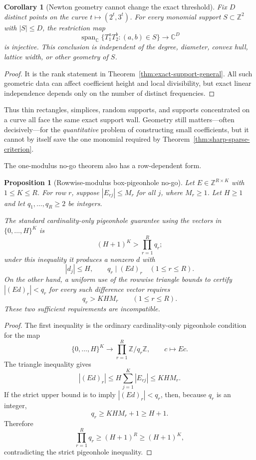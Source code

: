 \documentclass[11pt,oneside]{article}
\newtheorem{proposition}[theorem]{Proposition}
\newtheorem{corollary}[theorem]{Corollary}
\theoremstyle{definition}
\theoremstyle{remark}
\newcommand{\Z}{\mathbb Z}
\newcommand{\C}{\mathbb C}
\newcommand{\Span}{\operatorname{span}}
\begin{document}
\begin{corollary}[Newton geometry cannot change the exact threshold]
\label{cor:newton-geometry-no-shortcut}
Fix $D$ distinct points on the curve $t\mapsto(2^t,3^t)$.  For every monomial support
$S\subset\Z^2$ with $|S|\le D$, the restriction map
\[
  \Span_{\C}\{T_1^aT_2^b:(a,b)\in S\}
  \longrightarrow \C^D
\]
is injective.  This conclusion is independent of the degree, diameter, convex hull, lattice
width, or other geometry of $S$.
\end{corollary}

\begin{proof}
It is the rank statement in Theorem~\ref{thm:exact-support-general}.  All such geometric data
can affect coefficient height and local divisibility, but exact linear independence depends
only on the number of distinct frequencies.
\end{proof}

Thus thin rectangles, simplices, random supports, and supports concentrated on a curve all
face the same exact support wall.  Geometry still matters---often decisively---for the
\emph{quantitative} problem of constructing small coefficients, but it cannot by itself save
the one monomial required by Theorem~\ref{thm:sharp-sparse-criterion}.

The one-modulus no-go theorem also has a row-dependent form.

\begin{proposition}[Rowwise-modulus box-pigeonhole no-go]
\label{prop:rowwise-modulus-no-go}
Let $E\in\Z^{R\times K}$ with $1\le K\le R$.  For row $r$, suppose
$|E_{rj}|\le M_r$ for all $j$, where $M_r\ge1$.  Let $H\ge1$ and let
$q_1,\dots,q_R\ge2$ be integers.

The standard cardinality-only pigeonhole guarantee using the vectors in
$\{0,\dots,H\}^K$ is
\[
  (H+1)^K>\prod_{r=1}^R q_r;
\]
under this inequality it produces a nonzero $d$ with
\[
  |d_j|\le H,
  \qquad q_r\mid(Ed)_r\quad(1\le r\le R).
\]
On the other hand, a uniform use of the rowwise triangle bounds to certify
$|(Ed)_r|<q_r$ for every such difference vector requires
\[
  q_r>KHM_r\qquad(1\le r\le R).
\]
These two sufficient requirements are incompatible.
\end{proposition}

\begin{proof}
The first inequality is the ordinary cardinality-only pigeonhole condition for the map
\[
  \{0,\dots,H\}^K\longrightarrow
  \prod_{r=1}^R\Z/q_r\Z,
  \qquad c\longmapsto Ec.
\]
The triangle inequality gives
\[
  |(Ed)_r|\le H\sum_{j=1}^K|E_{rj}|\le KHM_r.
\]
If the strict upper bound is to imply $|(Ed)_r|<q_r$, then, because $q_r$ is an integer,
\[
  q_r\ge KHM_r+1\ge H+1.
\]
Therefore
\[
  \prod_{r=1}^Rq_r\ge(H+1)^R\ge(H+1)^K,
\]
contradicting the strict pigeonhole inequality.
\end{proof}
\end{document}
